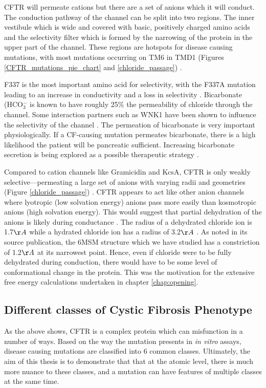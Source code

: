 CFTR will permeate cations but there are a set of anions which it will conduct. The conduction pathway of the channel can be split into two regions. The inner vestibule which is wide and covered with basic, positively charged amino acids and the selectivity filter which is formed by the narrowing of the protein in the upper part of the channel. These regions are hotspots for disease causing  mutations, with most mutations occurring on TM6 in TMD1 (Figures \ref{CFTR_mutations_pie_chart} and \ref{chloride_passage}) \cite{cftr2}.

F337 is the most important amino acid for selectivity, with the F337A mutation leading to an increase in conductivity and a loss in selectivity \cite{wei2016}. Bicarbonate (HCO$_3^-$ is known to have roughly 25\% the permeability of chloride through the channel\cite{tang2009}. Some interaction partners such as WNK1 have been shown to influence the selectivity of the channel \cite{kim2019, garnett2011, kim2019a}. The permeation of bicarbonate is very important physiologically. If a CF-causing mutation permeates bicarbonate, there is a high likelihood the patient will be pancreatic sufficient. Increasing bicarbonate secretion is being explored as a possible therapeutic strategy \cite{ferrera2021}. 

Compared to cation channels like Gramicidin and KcsA, CFTR is only weakly selective---permeating a large set of anions with varying radii and geometries (Figure \ref{chloride_passage}) \cite{linsdell1998, tabcharani1997, poulsen1994}. CFTR appears to act like other anion channels where lyotropic (low solvation energy) anions pass more easily than kosmotropic anions (high solvation energy). This would suggest that partial dehydration of the anions is likely during conductance \cite{linsdell2000}. The radius of a dehydrated chloride ion is 1.7$\AA$ while a hydrated chloride ion has a radius of 3.2$\AA$ \cite{yang2002}. As noted in its source publication, the 6MSM structure which we have studied has a constriction of 1.2$\AA$ at its narrowest point. Hence, even if chloride were to be fully dehydrated during conduction, there would have to be some level of conformational change in the protein. This was the motivation for the extensive free energy calculations undertaken in chapter \ref{chap:opening}.

\subsection{Different classes of Cystic Fibrosis Phenotype}
As the above shows, CFTR is a complex protein which can misfunction in a number of ways. Based on the way the mutation presents in \textit{in vitro} assays, disease causing mutations are classified into 6 common classes. Ultimately, the aim of this thesis is to demonstrate that that at the atomic level, there is much more nuance to these classes, and a mutation can have features of multiple classes at the same time.

